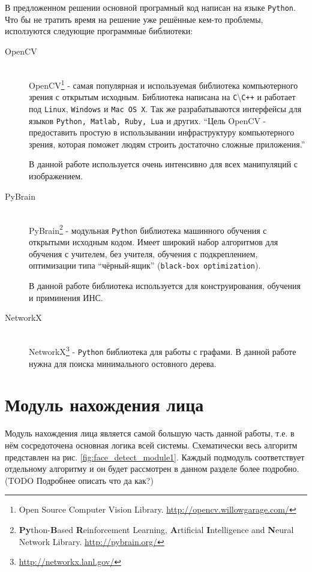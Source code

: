 \documentclass[12pt]{report}
\begin{document}
В предложенном решении основной програмный код написан на языке \texttt{Python}. Что бы не тратить время на решение уже решённые кем-то проблемы, исползуются следующие программные библиотеки:
\begin{description}

\item[OpenCV]\hfill \\
	OpenCV\footnote{Open Source Computer Vision Library. \url{http://opencv.willowgarage.com/}} - самая популярная и используемая библиотека компьютерного зрения с открытым исходным. Библиотека написана на \texttt{С}\textbackslash{}\texttt{С++} и работает под \texttt{Linux}, \texttt{Windows} и \texttt{Mac OS X}. Так же разрабатываются интерфейсы для языков \texttt{Python, Matlab, Ruby, Lua} и других. ``Цель OpenCV - предоставить простую в использывании инфраструктуру компьютерного зрения, которая поможет людям строить достаточно сложные приложения.'' \citep{bradski2008learning}
	
В данной работе используется очень интенсивно для всех манипуляций с изображением.

\item[PyBrain]\hfill \\
	PyBrain\footnote{\textbf{Py}thon-\textbf{B}ased \textbf{R}einforcement Learning, \textbf{A}rtificial \textbf{I}ntelligence and \textbf{N}eural Network Library. \url{http://pybrain.org/}} - модульная \texttt{Python} библиотека машинного обучения с открытыми исходным кодом. Имеет широкий набор алгоритмов для обучения с учителем, без учителя, обучения с подкреплением, оптимизации типа ``чёрный-ящик'' (\texttt{black-box optimization}).
	
В данной работе библиотека используется для конструирования, обучения и приминения ИНС.

\item[NetworkX]\hfill \\
NetworkX\footnote{\url{http://networkx.lanl.gov/}} - \texttt{Python} библиотека для работы с графами. В данной работе нужна для поиска минимального остовного дерева.

\end{description}

\section{Модуль нахождения лица}

Модуль нахождения лица является самой большую часть данной работы, т.е. в нём сосредоточена основная логика всей системы. Схематически весь алгоритм представлен на рис. \ref{fig:face_detect_module1}. Каждый подмодуль соответствует отдельному алгоритму и он будет рассмотрен в данном разделе более подробно. (TODO Подробнее описать что да как?)
\end{document}
